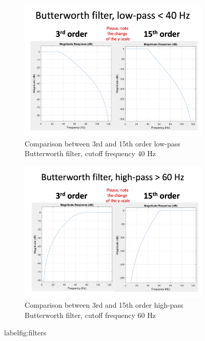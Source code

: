 \begin{figure}[!htpb]
\centering
\begin{subfigure}[b]{0.45\textwidth}
   \includegraphics[width=1\linewidth]{img/ch3/lp-butterworth-filter}
   \caption{Comparison between 3rd and 15th order low-pass Butterworth filter, cutoff frequency 40 Hz}
   \label{fig:lp-filters}
\end{subfigure}

\begin{subfigure}[b]{0.45\textwidth}
   \includegraphics[width=1\linewidth]{img/ch3/hp-butterworth-filter}
   \caption{Comparison between 3rd and 15th order high-pass Butterworth filter, cutoff frequency 60 Hz}
   \label{fig:hp-filters}
\end{subfigure}
\caption[]{}
label{fig:filters}
\end{figure}

